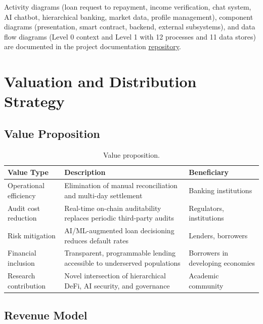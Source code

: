 \documentclass[11pt,a4paper]{article}
\newcommand{\tableheadfont}{\bfseries\small\color{PrimaryBlue}}
\newenvironment{moderntable}[1][H]{%
    \begin{table}[#1]\centering\small%
    \renewcommand{\arraystretch}{1.35}%
}{%
    \end{table}%
}
\begin{document}
Activity diagrams (loan request to repayment, income verification, chat system, AI chatbot, hierarchical banking, market data, profile management), component diagrams (presentation, smart contract, backend, external subsystems), and data flow diagrams (Level 0 context and Level 1 with 12 processes and 11 data stores) are documented in the project documentation \href{https://drive.google.com/drive/folders/1en_Mxk-q1YrfYVDmOe1efgS85c724CQ_?usp=sharing}{repository}.

\section{Valuation and Distribution Strategy}

\subsection{Value Proposition}

\begin{moderntable}
\caption{Value proposition.}
\begin{tabular}{@{} >{\raggedright}p{3.2cm} >{\raggedright}p{5cm} >{\raggedright\arraybackslash}p{3.5cm} @{}}
\toprule
\tableheadfont Value Type & \tableheadfont Description & \tableheadfont Beneficiary \\
\midrule
\rowcolor{RowShade}
Operational efficiency & Elimination of manual reconciliation and multi-day settlement & Banking institutions \\
Audit cost reduction & Real-time on-chain auditability replaces periodic third-party audits & Regulators, institutions \\
\rowcolor{RowShade}
Risk mitigation & AI/ML-augmented loan decisioning reduces default rates & Lenders, borrowers \\
Financial inclusion & Transparent, programmable lending accessible to underserved populations & Borrowers in developing economies \\
\rowcolor{RowShade}
Research contribution & Novel intersection of hierarchical DeFi, AI security, and governance & Academic community \\
\bottomrule
\end{tabular}
\end{moderntable}

\subsection{Revenue Model}
\end{document}
